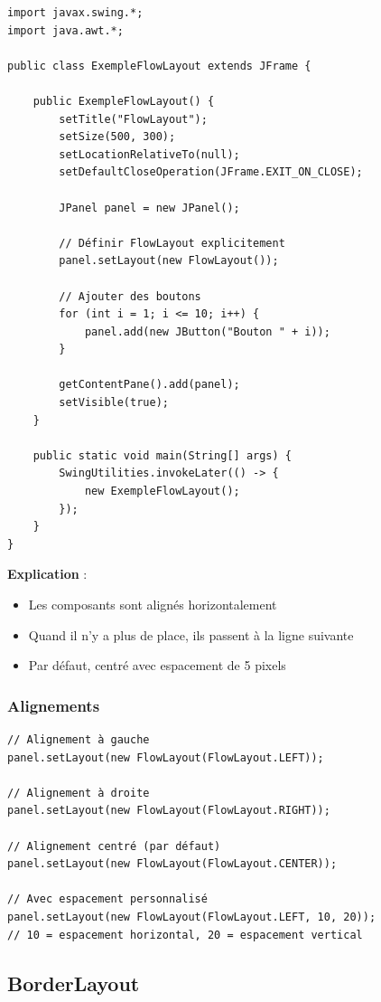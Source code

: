 \documentclass[11pt,a4paper]{article}
\begin{document}
\begin{lstlisting}
import javax.swing.*;
import java.awt.*;

public class ExempleFlowLayout extends JFrame {
    
    public ExempleFlowLayout() {
        setTitle("FlowLayout");
        setSize(500, 300);
        setLocationRelativeTo(null);
        setDefaultCloseOperation(JFrame.EXIT_ON_CLOSE);
        
        JPanel panel = new JPanel();
        
        // Définir FlowLayout explicitement
        panel.setLayout(new FlowLayout());
        
        // Ajouter des boutons
        for (int i = 1; i <= 10; i++) {
            panel.add(new JButton("Bouton " + i));
        }
        
        getContentPane().add(panel);
        setVisible(true);
    }
    
    public static void main(String[] args) {
        SwingUtilities.invokeLater(() -> {
            new ExempleFlowLayout();
        });
    }
}
\end{lstlisting}

\textbf{Explication} :
\begin{itemize}
    \item Les composants sont alignés horizontalement
    \item Quand il n'y a plus de place, ils passent à la ligne suivante
    \item Par défaut, centré avec espacement de 5 pixels
\end{itemize}

\subsubsection{Alignements}

\begin{lstlisting}
// Alignement à gauche
panel.setLayout(new FlowLayout(FlowLayout.LEFT));

// Alignement à droite
panel.setLayout(new FlowLayout(FlowLayout.RIGHT));

// Alignement centré (par défaut)
panel.setLayout(new FlowLayout(FlowLayout.CENTER));

// Avec espacement personnalisé
panel.setLayout(new FlowLayout(FlowLayout.LEFT, 10, 20));
// 10 = espacement horizontal, 20 = espacement vertical
\end{lstlisting}

\subsection{BorderLayout}
\end{document}
